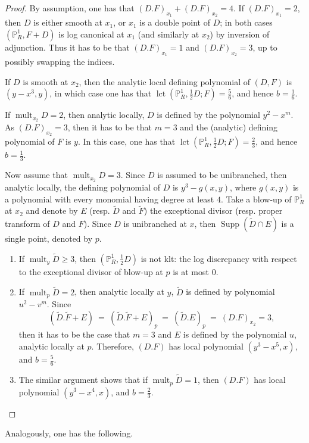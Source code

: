 \documentclass[a4paper,12pt]{amsart}
\newcommand{\wt}[1]{\widetilde{#1}}
\DeclareMathOperator{\mult}{mult}
\DeclareMathOperator{\Supp}{Supp}
\DeclareMathOperator{\lct}{lct}
\newcommand{\bP}{{\mathbb P}}
\theoremstyle{definition}
\theoremstyle{remark}
\begin{document}
\begin{proof}
   By assumption, one has that $(D.F)_{x_1}+(D.F)_{x_2}=4$. If $(D.F)_{x_1}=2$, then $D$ is either smooth at $x_1$, or $x_1$ is a double point of $D$; in both cases $(\bP^1_{R},F+D)$ is log canonical at $x_1$ (and similarly at $x_2$) by inversion of adjunction. Thus it has to be that $(D.F)_{x_1}=1$ and $(D.F)_{x_2}=3$, up to possibly swapping the indices.

   If $D$ is smooth at $x_2$, then the analytic local defining polynomial of $(D,F)$ is $(y-x^3,y)$, in which case one has that $\lct(\bP^1_R,\frac{1}{2}D;F)=\frac{5}{6}$, and hence $b=\frac{1}{6}$.

   If $\mult_{x_2}D=2$, then analytic locally, $D$ is defined by the polynomial $y^2-x^m$. As $(D.F)_{x_2}=3$, then it has to be that $m=3$ and the (analytic) defining polynomial of $F$ is $y$. In this case, one has that $\lct(\bP^1_R,\frac{1}{2}D;F)=\frac{2}{3}$, and hence $b=\frac{1}{3}$. 

   Now assume that $\mult_{x_2}D=3$. Since $D$ is assumed to be unibranched, then analytic locally, the defining polynomial of $D$ is $y^3-g(x,y)$, where $g(x,y)$ is a polynomial with every monomial having degree at least $4$. Take a blow-up of $\bP^1_R$ at $x_2$ and denote by $E$ (resp. $\wt{D}$ and $\wt{F}$) the exceptional divisor (resp. proper transform of $D$ and $F$). Since $D$ is unibranched at $x$, then $\Supp(\wt{D}\cap E)$ is a single point, denoted by $p$. 
   \begin{enumerate}
       \item If $\mult_y\wt{D}\geq3$, then $(\bP^1_R,\frac{1}{2}D)$ is not klt: the log discrepancy with respect to the exceptional divisor of blow-up at $p$ is at most $0$. 
       \item If $\mult_p\wt{D}=2$, then analytic locally at $y$, $\wt{D}$ is defined by polynomial $u^2-v^m$. Since $$(\wt{D}.\wt{F}+E)\ = \ (\wt{D}.\wt{F}+E)_p \ =\ (\wt{D}.E)_p \ = \ (D.F)_{x_2}=3,$$ then it has to be the case that $m=3$ and $E$ is defined by the polynomial $u$, analytic locally at $p$. Therefore, $(D.F)$ has local polynomial $(y^3-x^5,x)$, and $b=\frac{5}{6}$.
       \item The similar argument shows that if $\mult_p\wt{D}=1$, then $(D.F)$ has local polynomial $(y^3-x^4,x)$, and $b=\frac{2}{3}$.
   \end{enumerate}
\end{proof}



Analogously, one has the following.
\end{document}
